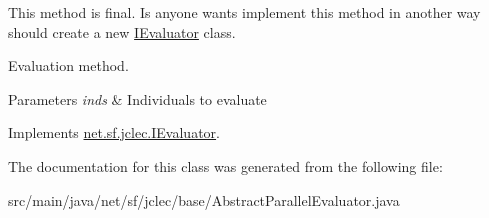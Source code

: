 This method is final. Is anyone wants implement this method in another way should create a new \hyperlink{interfacenet_1_1sf_1_1jclec_1_1_i_evaluator}{I\-Evaluator} class.

Evaluation method.


\begin{DoxyParams}{Parameters}
{\em inds} & Individuals to evaluate\\
\hline
\end{DoxyParams}
 

Implements \hyperlink{interfacenet_1_1sf_1_1jclec_1_1_i_evaluator_a6a64b0d69f99da5be8a6c5b01c7752c2}{net.\-sf.\-jclec.\-I\-Evaluator}.



The documentation for this class was generated from the following file\-:\begin{DoxyCompactItemize}
\item 
src/main/java/net/sf/jclec/base/Abstract\-Parallel\-Evaluator.\-java\end{DoxyCompactItemize}
